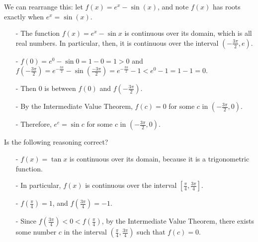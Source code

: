 \begin{frame}[t]
\begin{QuestionSet}
{\color{answercolor}
We can rearrange this: let $f(x)=e^x-\sin(x)$, and note $f(x)$ has roots exactly when \textcolor{C3}{$e^x=\sin(x)$}.
\begin{itemize}\color{answercolor}
\item[-] The function $f(x)=e^x-\sin x$ is continuous over its domain, which is all real numbers. In particular, then, it is continuous over the interval $\left(-\frac{3\pi}{2},e\right)$.
\item[-] $f(0)=e^0-\sin 0=1-0=1>0$ and $f\left(-\frac{3\pi}{2}\right)=e^{-\frac{3\pi}{2}}-\sin\left(\frac{-3\pi}{2}\right)=e^{-\frac{3\pi}{2}}-1<e^0-1=1-1=0$.
\item[-] Then $0$ is between $f(0)$ and $f\left(-\frac{3\pi}{2}\right)$.
\item[-] By the Intermediate Value Theorem, $f(c)=0$ for some $c$ in $\left(-\frac{3\pi}{2},0\right)$.
\item[-] Therefore, $e^c=\sin c$ for some $c$ in $\left(-\frac{3\pi}{2},0\right)$.
\end{itemize}
\color{black}}

\end{QuestionSet}
\end{frame}
\begin{frame}
\NowYou Is the following reasoning correct?
\AnswerSpace{}\vfill\vfill

\begin{itemize}\color{C1}
\item[-] $f(x)=\tan x$ is continuous over its domain, because it is a trigonometric function.\vfill

\item[-]In particular, $f(x)$ is continuous over the interval $\left[\frac{\pi}{4},\frac{3\pi}{4}\right]$. \vfill

\item[-]$f\left(\frac{\pi}{4}\right) = 1$, and $f\left(\frac{3\pi}{4}\right)=-1$.\vfill

\item[-]Since $f\left(\frac{3\pi}{4}\right)<0<f\left(\frac{\pi}{4}\right)$, by the Intermediate Value Theorem, there exists some number $c$ in the interval $\left(\frac{\pi}{4},\frac{3\pi}{4}\right)$ such that $f(c)=0$.\vfill
\end{itemize}
\end{frame}
